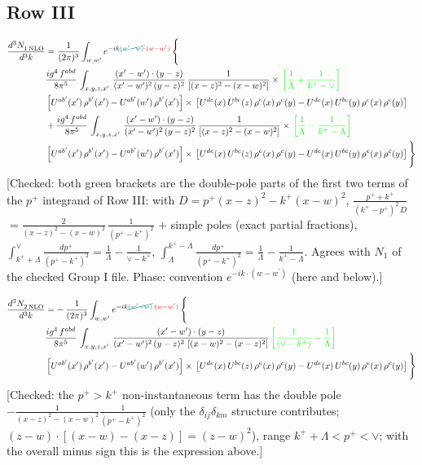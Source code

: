 \documentclass[9pt]{article}
\numberwithin{equation}{section}
\begin{document}
\subsection{Row III}
\begin{align}
   \frac{d^{3}N_{1\,\rm NLO}^{\rm}}{d^{3}k}  & = \frac{1}{(2\pi)^{3}}  \int_{w, w^\prime} e^{-ik{\color{teal}\cancel{(w^\prime-w)}}{\color{red}\cdot(w-w^\prime)}}\, \Bigg\{\notag \\ & \frac{ig^{4}\,f^{abd}}{8\pi^{5}}\,\int_{x,y,z,x'}\, \frac{(x'-w')\cdot (y-z)}{(x'-w')^{2}\,(y-z)^{2}}\, \frac{1}{\left[(x-z)^{2}-(x-w)^{2}\right]}\times\, {\color{green}\left[\frac{1}{\Lambda}+\frac{1}{k^{+}-\vee}\right]}\notag \\ & \left[U^{ab'}(x')\,\rho^{b'}(x')-U^{ab'}(w')\, \rho^{b'}(x')\right]\times\, \left[U^{de}(x)\,U^{bc}(z)\, \rho^{e}(x)\,\rho^{c}(y)-U^{de}(x)\,U^{bc}(y)\,\rho^{e}(x)\,\rho^{c}(y)\right]\notag \\ &  + \frac{ig^{4}\,f^{abd}}{8\pi^{5}}\,\int_{x,y,z,x'}\, \frac{(x'-w')\cdot (y-z)}{(x'-w')^{2}\,(y-z)^{2}}\, \frac{1}{\left[(x-z)^{2}-(x-w)^{2}\right]}\times\, {\color{green}\left[\frac{1}{\Lambda}-\frac{1}{k^{+}-\Lambda}\right]}\notag \\ & \left[U^{ab'}(x')\,\rho^{b'}(x')-U^{ab'}(w')\, \rho^{b'}(x')\right]\times\, \left[U^{de}(x)\,U^{bc}(z)\, \rho^{e}(x)\,\rho^{c}(y)-U^{de}(x)\,U^{bc}(y)\,\rho^{e}(x)\,\rho^{c}(y)\right]\Bigg\}
\end{align} {\color{red}[Checked: both green brackets are the double-pole parts of the first two terms of the $p^{+}$ integrand of Row III: with $D=p^{+}(x-z)^{2}-k^{+}(x-w)^{2}$, $\frac{p^{+}+k^{+}}{(k^{+}-p^{+})^{2}\,D}$ $=\frac{2}{(x-z)^{2}-(x-w)^{2}}\,\frac{1}{(p^{+}-k^{+})^{2}}$ $+$ simple poles (exact partial fractions), $\int_{k^{+}+\Lambda}^{\vee}\frac{dp^{+}}{(p^{+}-k^{+})^{2}}=\frac{1}{\Lambda}-\frac{1}{\vee-k^{+}}$, $\int_{\Lambda}^{k^{+}-\Lambda}\frac{dp^{+}}{(p^{+}-k^{+})^{2}}=\frac{1}{\Lambda}-\frac{1}{k^{+}-\Lambda}$. Agrees with $N_{1}$ of the checked Group I file. Phase: convention $e^{-ik\cdot(w-w^\prime)}$ (here and below).]}\par\noindent
\begin{align}
   \frac{d^{3}N_{2\,\rm NLO}^{\rm}}{d^{3}k}  & = -\,\frac{1}{(2\pi)^{3}}  \int_{w, w^\prime} e^{-ik{\color{teal}\cancel{(w^\prime-w)}}{\color{red}\cdot(w-w^\prime)}}\, \Bigg\{\notag \\ & \frac{ig^{4}\, f^{abd}}{8\pi^{5}}\, \int_{x,y,z,x'}\,\frac{(x'-w')\cdot (y-z)}{(x'-w')^{2}\, (y-z)^{2}\,\left[(x-w)^{2}-(x-z)^{2}\right]}\,{\color{green}\left[\frac{1}{(\vee-k^{+})}-\frac{1}{\Lambda}\right]} \notag \\ & \left[U^{ab'}(x')\,\rho^{b'}(x')-U^{ab'}(w')\, \rho^{b'}(x')\right]\times\,\left[U^{de}(x)\,U^{bc}(z)\, \rho^{e}(x)\,\rho^{c}(y)-U^{de}(x)\,U^{bc}(y)\,\rho^{e}(x)\,\rho^{c}(y)\right]\Bigg\} 
\end{align} {\color{red}[Checked: the $p^{+}>k^{+}$ non-instantaneous term has the double pole $-\frac{1}{(x-z)^{2}-(x-w)^{2}}\frac{1}{(p^{+}-k^{+})^{2}}$ (only the $\delta_{ij}\delta_{km}$ structure contributes; $(z-w)\cdot[(x-w)-(x-z)]=(z-w)^{2}$), range $k^{+}+\Lambda<p^{+}<\vee$; with the overall minus sign this is the expression above.]}\par\noindent
\end{document}
